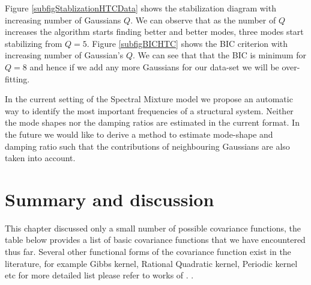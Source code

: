 Figure \ref{subfigStablizationHTCData} shows the stabilization diagram with increasing number of Gaussians $Q$. We can observe that as the number of $Q$ increases the algorithm starts finding better and better modes, three modes start stabilizing from $Q=5$. Figure \ref{subfigBICHTC} shows the BIC criterion with increasing number of Gaussian's $Q$. We can see that that the BIC is minimum for $Q=8$ and hence if we add any more Gaussians for our data-set we will be  over-fitting. 

In the current setting of the Spectral Mixture model we propose an automatic way to identify the most important frequencies of a structural system. Neither the mode shapes nor the damping ratios are estimated in the current format. In the future we would like to derive a method to estimate mode-shape and damping ratio such that the contributions of neighbouring Gaussians are also taken into account. 

\section{Summary and discussion}\label{sec:ch4Summary}
This chapter discussed only a small number of possible covariance functions, the table below provides a list of basic covariance functions that we have encountered thus far. Several other functional forms of the covariance function exist in the literature, for example Gibbs kernel, Rational Quadratic kernel, Periodic kernel etc for more detailed list please refer to works of \cite{Rasmussen2005, duvenaud2013structure, wilson2014thesis}. . 


